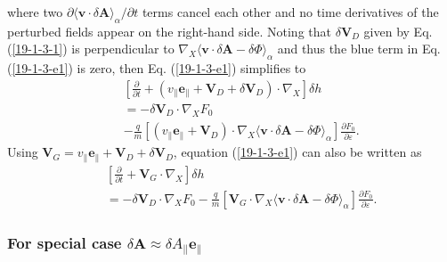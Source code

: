 \documentclass{llncs}
\begin{document}
where two $\partial \langle \mathbf{v} \cdot \delta \mathbf{A}
\rangle_{\alpha} / \partial t$ terms cancel each other and no time derivatives
of the perturbed fields appear on the right-hand side. Noting that $\delta
\mathbf{V}_D$ given by Eq. (\ref{19-1-3-1}) is perpendicular to $\nabla_X
\langle \mathbf{v} \cdot \delta \mathbf{A}- \delta \Phi \rangle_{\alpha}$ and
thus the blue term in Eq. (\ref{19-1-3-e1}) is zero, then Eq.
(\ref{19-1-3-e1}) simplifies to
\begin{eqnarray}
  &  & \left[ \frac{\partial}{\partial t} + (v_{\parallel}
  \mathbf{e}_{\parallel} +\mathbf{V}_D + \delta \mathbf{V}_D) \cdot \nabla_X
  \right] \delta h \nonumber\\
  &  & = - \delta \mathbf{V}_D \cdot \nabla_X F_0 \nonumber\\
  &  & - \frac{q}{m} [(v_{\parallel} \mathbf{e}_{\parallel} +\mathbf{V}_D)
  \cdot \nabla_X \langle \mathbf{v} \cdot \delta \mathbf{A}- \delta \Phi
  \rangle_{\alpha}] \frac{\partial F_0}{\partial \varepsilon} . 
  \label{19-1-4-e1}
\end{eqnarray}
Using $\mathbf{V}_G = v_{\parallel} \mathbf{e}_{\parallel} +\mathbf{V}_D +
\delta \mathbf{V}_D$, equation (\ref{19-1-3-e1}) can also be written as
\begin{eqnarray}
  &  & \left[ \frac{\partial}{\partial t} +\mathbf{V}_G \cdot \nabla_X
  \right] \delta h \nonumber\\
  &  & = - \delta \mathbf{V}_D \cdot \nabla_X F_0 - \frac{q}{m} [\mathbf{V}_G
  \cdot \nabla_X \langle \mathbf{v} \cdot \delta \mathbf{A}- \delta \Phi
  \rangle_{\alpha}] \frac{\partial F_0}{\partial \varepsilon} . 
  \label{19-3-30-1}
\end{eqnarray}

\subsubsection{For special case $\delta \mathbf{A} \approx \delta
A_{\parallel} \mathbf{e}_{\parallel}$}
\end{document}
